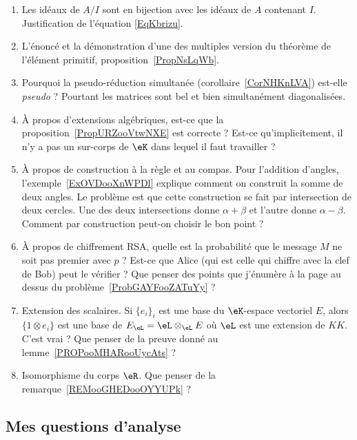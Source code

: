 \begin{enumerate}
    \item
        Les idéaux de \( A/I\) sont en bijection avec les idéaux de \( A\) contenant \( I\). Justification de l'équation \eqref{EqKbrizu}.
    \item
        L'énoncé et la démonstration d'une des multiples version du théorème de l'élément primitif, proposition~\ref{PropNsLqWb}.
    \item
        Pourquoi la pseudo-réduction simultanée (corollaire~\ref{CorNHKnLVA}) est-elle \emph{pseudo} ? Pourtant les matrices sont bel et bien simultanément diagonalisées.
    \item
        À propos d'extensions algébriques, est-ce que la proposition~\ref{PropURZooVtwNXE} est correcte ? Est-ce qu'implicitement, il n'y a pas un sur-corps de \( \eK\) dans lequel il faut travailler ?
    \item
        À propos de construction à la règle et au compas. Pour l'addition d'angles, l'exemple~\ref{ExOVDooXnWPDl} explique comment on construit la somme de deux angles. Le problème est que cette construction se fait par intersection de deux cercles. Une des deux intersections donne \( \alpha+\beta\) et l'autre donne \( \alpha-\beta\). Comment par construction peut-on choisir le bon point ?
    \item
        À propos de chiffrement RSA, quelle est la probabilité que le message \( M\) ne soit pas premier avec \( p\) ? Est-ce que Alice (qui est celle qui chiffre avec la clef de Bob) peut le vérifier ? Que penser des points que j'énumère à la page \pageref{PageAKTBooMDeQxY} au dessus du problème~\ref{ProbGAYFooZATuYy} ?
    \item
        Extension des scalaires. Si \( \{ e_i \}_i\) est une base du \( \eK\)-espace vectoriel \( E\), alors \( \{ 1\otimes e_i \}\) est une base de \( E_{\eL}=\eL\otimes_{\eL}E\) où \( \eL\) est une extension de \( KK\). C'est vrai ? Que penser de la preuve donné au lemme~\ref{PROPooMHARooUycAts} ?
    \item
        Isomorphisme du corps \( \eR\). Que penser de la remarque~\ref{REMooGHEDooOYYUPk} ?
\end{enumerate}

\subsection{Mes questions d'analyse}

